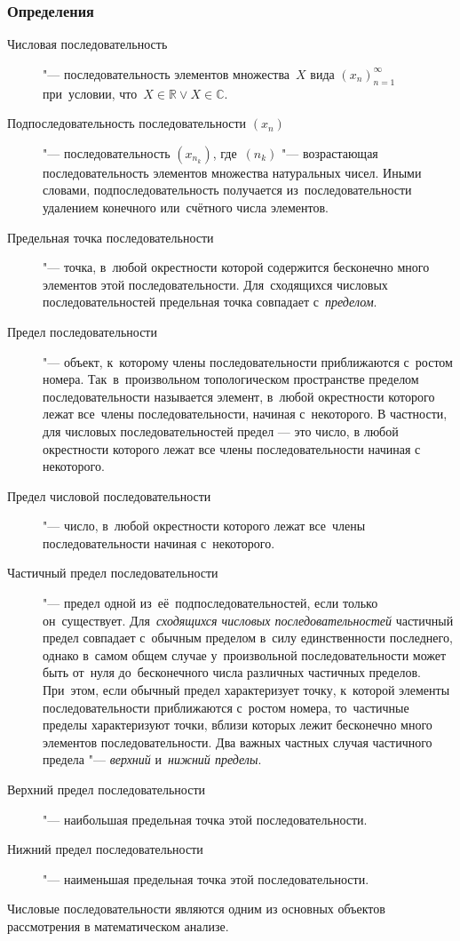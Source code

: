 \documentclass[]{scrartcl}
\begin{document}
\subsubsection{Определения}
\begin{description}
	\item[Числовая последовательность] "--- последовательность элементов множества~${\textstyle X}$ вида ${\textstyle (x_n)_{n=1}^{\infty}}$ при~условии, что~${\textstyle X \in \mathbb{R} \vee X \in \mathbb{C}}$.
	\item[Подпоследовательность последовательности ${\textstyle (x_n)}$] "--- последовательность ${\textstyle (x_{n_{k}})}$, где~${\textstyle (n_{k})}$ "--- возрастающая последовательность элементов множества натуральных чисел. Иными словами, подпоследовательность получается из~последовательности удалением конечного или~счётного числа элементов.
	\item[Предельная точка последовательности] "--- точка, в~любой окрестности которой содержится бесконечно много элементов этой последовательности. Для~сходящихся числовых последовательностей предельная точка совпадает с~\emph{пределом}.
	\item[Предел последовательности] "--- объект, к~которому члены последовательности приближаются с~ростом номера. Так~в~произвольном топологическом пространстве пределом последовательности называется элемент, в~любой окрестности которого лежат все~члены последовательности, начиная с~некоторого. В частности, для числовых последовательностей предел — это число, в любой окрестности которого лежат все члены последовательности начиная с некоторого.
	\item[Предел числовой последовательности] "--- число, в~любой окрестности которого лежат все~члены последовательности начиная с~некоторого.
	\item[Частичный предел последовательности] "--- предел одной из~её~подпоследовательностей, если только он~существует. Для~\emph{сходящихся числовых последовательностей} частичный предел совпадает с~обычным пределом в~силу единственности последнего, однако в~самом общем случае у~произвольной последовательности может быть от~нуля до~бесконечного числа различных частичных пределов. При~этом, если обычный предел характеризует точку, к~которой элементы последовательности приближаются с~ростом номера, то~частичные пределы характеризуют точки, вблизи которых лежит бесконечно много элементов последовательности.
	Два важных частных случая частичного предела "--- \emph{верхний} и~\emph{нижний пределы}.
	\item[Верхний предел последовательности] "--- наибольшая предельная точка этой последовательности. 
	\item[Нижний предел последовательности] "--- наименьшая предельная точка этой последовательности.
\end{description}
Числовые последовательности являются одним из основных объектов рассмотрения в математическом анализе.
\end{document}
